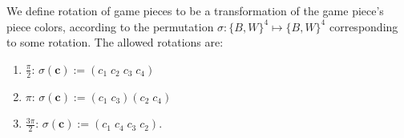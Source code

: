 \begin{description}[style=unboxed, leftmargin=0cm,labelsep=1em]
    \item[Rotating pieces] We define rotation of game pieces to be a transformation of the game piece's piece colors, according to the permutation $\sigma: \{B,W\}^4 \mapsto \{B,W\}^4$ corresponding to some rotation. The allowed rotations are:

    \begin{enumerate}
        \item $\frac{\pi}{2}$: $\sigma(\mathbf{c}) := (c_1\;c_2\;c_3\;c_4)$
        \item $\pi$: $\sigma(\mathbf{c}) := (c_1\;c_3)(c_2\;c_4)$
        \item $\frac{3 \pi}{2}$: $\sigma(\mathbf{c}) := (c_1\;c_4\;c_3\;c_2)$.
    \end{enumerate}
\end{description}
